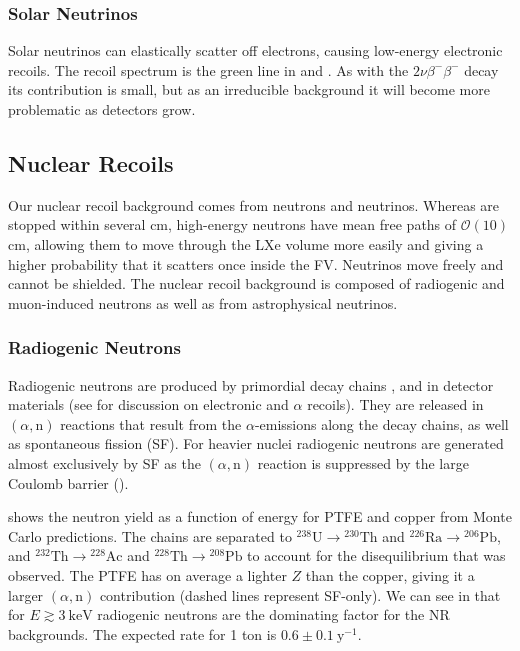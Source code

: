 \subsubsection{Solar Neutrinos}
\label{subsubsec:backgrounds_electronic_solar_neutrinos}
Solar neutrinos can elastically scatter off electrons, causing low-energy electronic recoils.  The recoil spectrum is the green line in
 and .  As with the  $2 \nu \beta^- \beta^-$
decay its contribution is small, but as an irreducible background it will become more problematic as detectors grow.



\subsection{Nuclear Recoils}
\label{subsec:backgrounds_nuclear}
Our nuclear recoil background comes from neutrons and neutrinos.  Whereas \gammarays are stopped within several cm, high-energy neutrons
have mean free paths of $\mathcal{O}(10)$ cm, allowing them to move through the LXe volume more easily and giving a higher probability
that it scatters once inside the FV.  Neutrinos move freely and cannot be shielded.  The nuclear recoil background is composed of
radiogenic and muon-induced neutrons as well as from astrophysical neutrinos.



\subsubsection{Radiogenic Neutrons}
\label{subsubsec:backgrounds_nuclear_radiogenic}
Radiogenic neutrons are produced by primordial decay chains ,  and  in detector materials
(see  for discussion on electronic and $\alpha$ recoils).  They are released in
$(\alpha, \mathrm{n})$ reactions that result from the $\alpha$-emissions along the decay chains, as well as spontaneous fission (SF).  For
heavier nuclei radiogenic neutrons are generated almost exclusively by SF as the $(\alpha, \mathrm{n})$ reaction is suppressed by the
large Coulomb barrier ().

 shows the neutron yield as a function of energy for PTFE and copper from Monte Carlo
predictions.  The chains are
separated to $\mathrm{^{238}U} \rightarrow \mathrm{^{230}Th}$ and $\mathrm{^{226}Ra} \rightarrow \mathrm{^{206}Pb}$, and
$\mathrm{^{232}Th} \rightarrow \mathrm{^{228}Ac}$ and $\mathrm{^{228}Th} \rightarrow \mathrm{^{208}Pb}$ to account for the disequilibrium
that was observed.  The PTFE has on average a lighter $Z$ than the copper, giving it a larger $(\alpha, \mathrm{n})$ contribution (dashed
lines represent SF-only).  We can see in  that for $E \gtrsim 3\ \mathrm{keV}$
radiogenic neutrons are the dominating factor for the NR backgrounds.  The expected rate for 1 ton is
$0.6 \pm 0.1\ \mathrm{y^{-1}}$.

